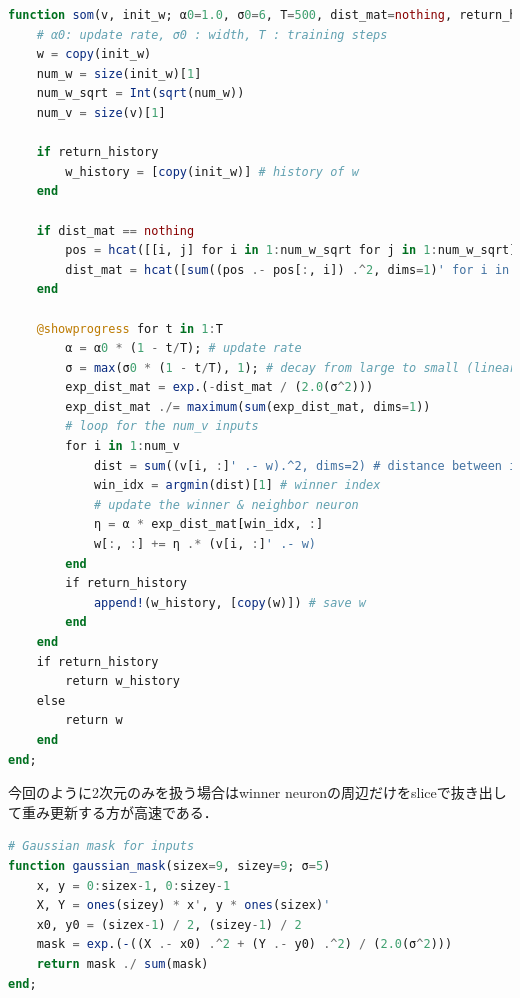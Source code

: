 \begin{lstlisting}[language=julia]
function som(v, init_w; α0=1.0, σ0=6, T=500, dist_mat=nothing, return_history=true)
    # α0: update rate, σ0 : width, T : training steps
    w = copy(init_w)
    num_w = size(init_w)[1]
    num_w_sqrt = Int(sqrt(num_w))
    num_v = size(v)[1]
    
    if return_history
        w_history = [copy(init_w)] # history of w
    end
    
    if dist_mat == nothing
        pos = hcat([[i, j] for i in 1:num_w_sqrt for j in 1:num_w_sqrt]...)
        dist_mat = hcat([sum((pos .- pos[:, i]) .^2, dims=1)' for i in 1:num_w]...); #'
    end
    
    @showprogress for t in 1:T
        α = α0 * (1 - t/T); # update rate
        σ = max(σ0 * (1 - t/T), 1); # decay from large to small (linearly decreased, avoid zero)
        exp_dist_mat = exp.(-dist_mat / (2.0(σ^2)))
        exp_dist_mat ./= maximum(sum(exp_dist_mat, dims=1))
        # loop for the num_v inputs
        for i in 1:num_v
            dist = sum((v[i, :]' .- w).^2, dims=2) # distance between input and neurons
            win_idx = argmin(dist)[1] # winner index
            # update the winner & neighbor neuron
            η = α * exp_dist_mat[win_idx, :]
            w[:, :] += η .* (v[i, :]' .- w)
        end
        if return_history
            append!(w_history, [copy(w)]) # save w
        end
    end
    if return_history
        return w_history
    else
        return w
    end
end;
\end{lstlisting}
今回のように2次元のみを扱う場合はwinner neuronの周辺だけをsliceで抜き出して重み更新する方が高速である．
\begin{lstlisting}[language=julia]
# Gaussian mask for inputs
function gaussian_mask(sizex=9, sizey=9; σ=5)
    x, y = 0:sizex-1, 0:sizey-1
    X, Y = ones(sizey) * x', y * ones(sizex)' 
    x0, y0 = (sizex-1) / 2, (sizey-1) / 2
    mask = exp.(-((X .- x0) .^2 + (Y .- y0) .^2) / (2.0(σ^2)))
    return mask ./ sum(mask)
end;
\end{lstlisting}
